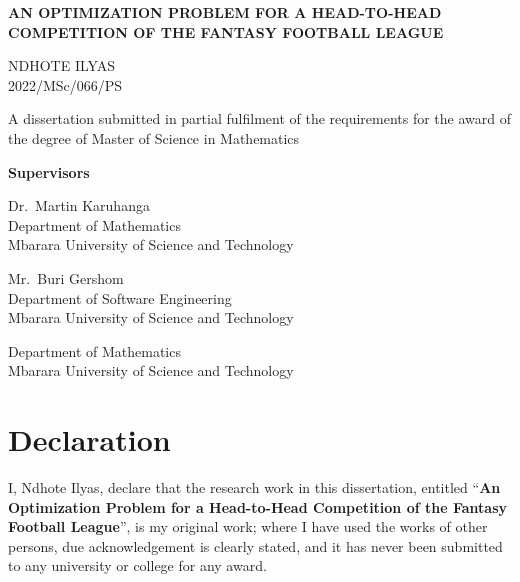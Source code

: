 \documentclass[12pt,oneside,a4paper]{book}
\date{}
\theoremstyle{definition}
\theoremstyle{remark}
\begin{document}
	\frontmatter

	\begin{titlepage}
		\centering
		\vspace*{1cm}
		{\LARGE\bfseries AN OPTIMIZATION PROBLEM FOR A HEAD-TO-HEAD COMPETITION OF THE FANTASY FOOTBALL LEAGUE\par}
		\vfill
		{\large NDHOTE ILYAS\\
			2022/MSc/066/PS\par}
		\vspace{1cm}
		{\large A dissertation submitted in partial fulfilment of the requirements for the award of the
			degree of Master of Science in Mathematics\par}
		\vfill
		{\large\bfseries Supervisors\par}
		\vspace{0.5cm}
		\begin{minipage}[t]{0.48\textwidth}
			\centering
			Dr.\ Martin Karuhanga\\
			Department of Mathematics\\
			Mbarara University of Science and Technology
		\end{minipage}\hfill
		\begin{minipage}[t]{0.48\textwidth}
			\centering
			Mr.\ Buri Gershom\\
			Department of Software Engineering\\
			Mbarara University of Science and Technology
		\end{minipage}
		\vfill
		{\large Department of Mathematics\\
			Mbarara University of Science and Technology\par}
	\end{titlepage}

	\chapter*{Declaration}
	I, Ndhote Ilyas, declare that the research work in this dissertation, entitled
	``\textbf{An Optimization Problem for a Head-to-Head Competition of the Fantasy Football League}'',
	is my original work; where I have used the works of other persons, due acknowledgement is
	clearly stated, and it has never been submitted to any university or college for any award.
\end{document}
